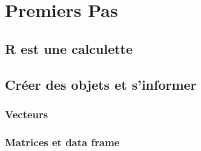 \section{Premiers Pas}
\subsection{R est une calculette}

\subsection{Créer des objets et s'informer}
\subsubsection{Vecteurs}

\subsubsection{Matrices et data frame}

